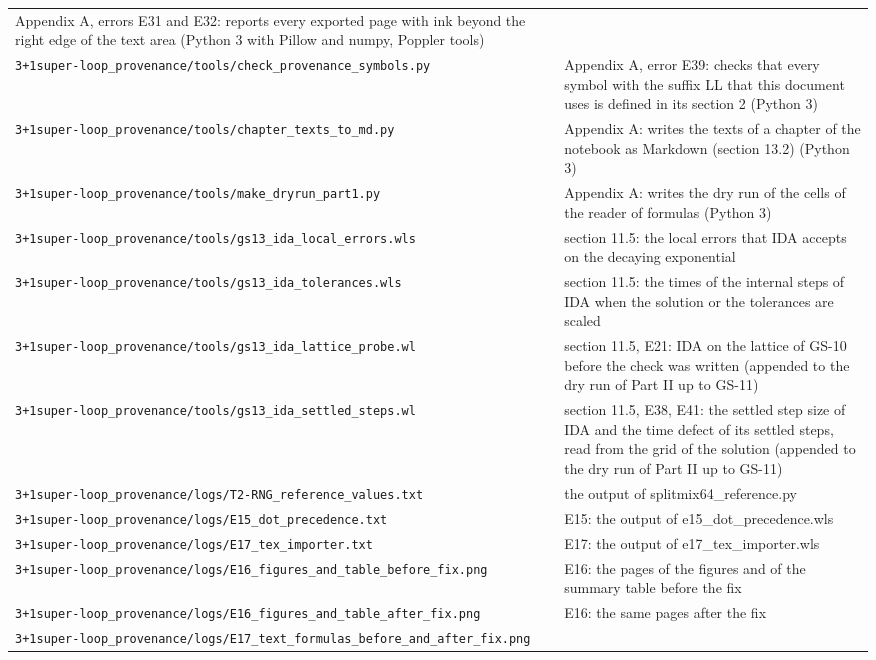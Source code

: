 \documentclass[
  10pt,
]{article}
\begin{document}
\begin{longtable}[]{@{}
  >{\raggedright\arraybackslash}p{}
  >{\raggedright\arraybackslash}p{}@{}}
Appendix A, errors E31 and E32: reports every exported page with ink
beyond the right edge of the text area (Python 3 with Pillow and numpy,
Poppler tools) \\
\texttt{3+1super-loop\_provenance/tools/check\_provenance\_symbols.py} &
Appendix A, error E39: checks that every symbol with the suffix LL that
this document uses is defined in its section 2 (Python 3) \\
\texttt{3+1super-loop\_provenance/tools/chapter\_texts\_to\_md.py} &
Appendix A: writes the texts of a chapter of the notebook as Markdown
(section 13.2) (Python 3) \\
\texttt{3+1super-loop\_provenance/tools/make\_dryrun\_part1.py} &
Appendix A: writes the dry run of the cells of the reader of formulas
(Python 3) \\
\texttt{3+1super-loop\_provenance/tools/gs13\_ida\_local\_errors.wls} &
section 11.5: the local errors that IDA accepts on the decaying
exponential \\
\texttt{3+1super-loop\_provenance/tools/gs13\_ida\_tolerances.wls} &
section 11.5: the times of the internal steps of IDA when the solution
or the tolerances are scaled \\
\texttt{3+1super-loop\_provenance/tools/gs13\_ida\_lattice\_probe.wl} &
section 11.5, E21: IDA on the lattice of GS-10 before the check was
written (appended to the dry run of Part II up to GS-11) \\
\texttt{3+1super-loop\_provenance/tools/gs13\_ida\_settled\_steps.wl} &
section 11.5, E38, E41: the settled step size of IDA and the time defect
of its settled steps, read from the grid of the solution (appended to
the dry run of Part II up to GS-11) \\
\texttt{3+1super-loop\_provenance/logs/T2-RNG\_reference\_values.txt} &
the output of splitmix64\_reference.py \\
\texttt{3+1super-loop\_provenance/logs/E15\_dot\_precedence.txt} & E15:
the output of e15\_dot\_precedence.wls \\
\texttt{3+1super-loop\_provenance/logs/E17\_tex\_importer.txt} & E17:
the output of e17\_tex\_importer.wls \\
\texttt{3+1super-loop\_provenance/logs/E16\_figures\_and\_table\_before\_fix.png}
& E16: the pages of the figures and of the summary table before the
fix \\
\texttt{3+1super-loop\_provenance/logs/E16\_figures\_and\_table\_after\_fix.png}
& E16: the same pages after the fix \\
\texttt{3+1super-loop\_provenance/logs/E17\_text\_formulas\_before\_and\_after\_fix.png}

\end{longtable}
\end{document}

